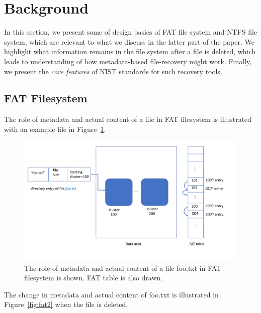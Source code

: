 \section{Background}

In this section, we present some of design basics of FAT file system and NTFS file system, 
which are relevant to what we discuss in the latter part of the paper. 
We highlight what information remains in the file system after a file is deleted, 
which leads to understanding of how metadata-based file-recovery might work. 
Finally, we present the \emph{core features} of NIST standards for such recovery tools.  

\subsection{FAT Filesystem}

The role of metadata and actual content of a file in FAT filesystem is illustrated with an example file in Figure~\ref{fig:fat1}.

\begin{figure}[h]
    \centering
    \includegraphics[width=\linewidth]{fig/fat1.pdf}
    \caption{The role of metadata and actual content of a file foo.txt in FAT filesystem is shown. FAT table is also drawn.}
    \label{fig:fat1}
\end{figure}


The change in metadata and actual content of foo.txt is illustrated in Figure~\ref{fig:fat2} when the file is deleted.


